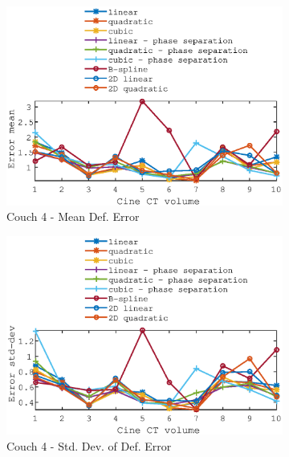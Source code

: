 \documentclass[11pt,a4paper,oneside]{report}
\begin{document}
\begin{figure}
\begin{subfigure}[b]{0.5\textwidth}
    \includegraphics[width=\textwidth, trim=0 0 0 \trimval,clip=true]{figures/task4/def_mean_error_couch4.eps}
    \caption{Couch 4 - Mean Def. Error}
  \end{subfigure}%
  \begin{subfigure}[b]{0.5\textwidth}
    \includegraphics[width=\textwidth, trim=0 0 0 \trimval,clip=true]{figures/task4/def_stddev_error_couch4.eps}
    \caption{Couch 4 - Std. Dev. of Def. Error}
  \end{subfigure}
  ~
    \hspace*{-2em}
  \begin{subfigure}[b]{0.5\textwidth}

\end{subfigure}
\end{figure}
\end{document}
